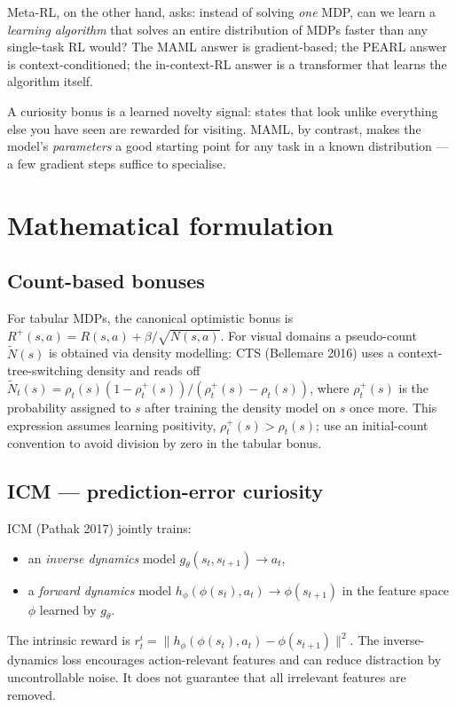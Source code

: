 \documentclass[11pt,oneside]{scrbook}
\begin{document}
Meta-RL, on the other hand, asks: instead of solving \emph{one} MDP, can we learn a \emph{learning algorithm} that solves an entire distribution of MDPs faster than any single-task RL would? The MAML answer is gradient-based; the PEARL answer is context-conditioned; the in-context-RL answer is a transformer that learns the algorithm itself.

\begin{intuition}
A curiosity bonus is a learned novelty signal: states that look unlike everything else you have seen are rewarded for visiting. MAML, by contrast, makes the model's \emph{parameters} a good starting point for any task in a known distribution --- a few gradient steps suffice to specialise.
\end{intuition}

\chapter{Mathematical formulation}

\section{Count-based bonuses}

For tabular MDPs, the canonical optimistic bonus is $R^+(s, a) = R(s, a) + \beta / \sqrt{N(s, a)}$. For visual domains a pseudo-count $\tilde N(s)$ is obtained via density modelling: CTS (Bellemare 2016) uses a context-tree-switching density and reads off $\tilde N_t(s) = \rho_t(s)(1 - \rho_t^+(s))/(\rho_t^+(s) - \rho_t(s))$, where $\rho_t^+(s)$ is the probability assigned to $s$ after training the density model on $s$ once more. This expression assumes learning positivity, $\rho_t^+(s)>\rho_t(s)$; use an initial-count convention to avoid division by zero in the tabular bonus.

\section{ICM --- prediction-error curiosity}

ICM (Pathak 2017) jointly trains:
\begin{itemize}
  \item an \emph{inverse dynamics} model $g_\theta(s_t, s_{t+1}) \to a_t$,
  \item a \emph{forward dynamics} model $h_\phi(\phi(s_t), a_t) \to \phi(s_{t+1})$
        in the feature space $\phi$ learned by $g_\theta$.
\end{itemize}
The intrinsic reward is $r^i_t = \|h_\phi(\phi(s_t), a_t) - \phi(s_{t+1})\|^2$. The inverse-dynamics
loss encourages action-relevant features and can reduce distraction by uncontrollable
noise. It does not guarantee that all irrelevant features are removed.
\end{document}
